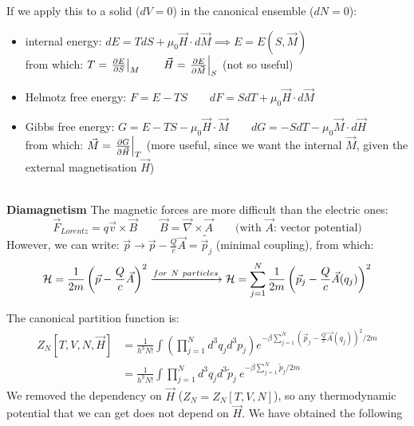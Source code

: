 If we apply this to a solid ($dV = 0$) in the canonical ensemble ($dN = 0$):
\begin{itemize}
    \item internal energy: $ dE = TdS + \mu_0 \vec H \cdot d\vec M \implies E = E(S,\vec M)$\\
    from which: $T = \left.\frac{\partial E}{\partial S}\right|_M \qquad \vec H = \left.\frac{\partial E}{\partial\vec M}\right|_S$ \quad (not so useful)
    \item Helmotz free energy: $F = E-TS \qquad dF = SdT + \mu_0 \vec H \cdot d\vec M$
    \item Gibbs free energy: $G = E-TS - \mu_0 \vec H \cdot \vec M \qquad dG = -SdT - \mu_0 \vec M \cdot d\vec H$\\
    from which: $\vec M = \left.\frac{\partial G}{\partial\vec H}\right|_T$ \quad (more useful, since we want the internal $\vec M$, given the external magnetisation $\vec H$)
\end{itemize}

\\

\textbf{Diamagnetism} The magnetic forces are more difficult than the electric ones:
$$ \vec F_{Lorentz} = q\vec v\times \vec B \qquad \vec B = \vec \nabla \times \vec A \qquad \text{(with $\vec A$: vector potential)}$$
However, we can write: $\vec p \to \vec p - \frac Qc \vec A = \widetilde{\vec p_j}$ \quad (minimal coupling), from which:
$$ \ham = \frac 1{2m} \left(\vec p - \frac Qc \vec A\right)^2 \xrightarrow{for\ N\ particles} \ham = \sum_{j=1}^N\frac 1{2m} \left(\vec p_j - \frac Qc \vec A(q_j)\right)^2$$

The canonical partition function is:
\begin{align*}
    Z_N[T,V,N,\vec H] &= \frac 1{h^3 N!} \int\left(\prod_{j=1}^N d^3q_j d^3 p_j\right) e^{-\beta \sum_{j=1}^N \left(\vec p_j - \frac Qc \vec A(q_j)\right)^2 / 2m} \\
    &= \frac 1{h^3 N!} \int \prod_{j=1}^N d^3 q_j d^3 \widetilde p_j \ e^{-\beta \sum_{j=1}^N \widetilde p_j/2m}
\end{align*}
We removed the dependency on $\vec H$  ($Z_N = Z_N[T,V,N]$), so any thermodynamic potential that we can get does not depend on $\vec H$. We have obtained the following

